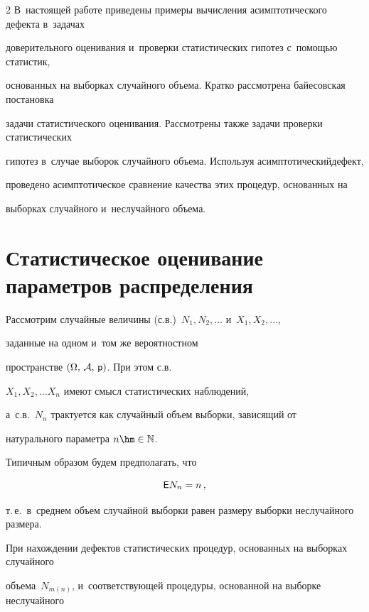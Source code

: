 \begin{multicols}{2}
В~настоящей работе приведены примеры вычисления асимптотического дефекта в~задачах 


доверительного оценивания и~проверки статистических гипотез с~помощью статистик, 


основанных на выборках случайного объема. Кратко рассмотрена байесовская постановка 


задачи статистического оценивания. Рассмотрены также задачи проверки статистических 


гипотез в~случае выборок случайного объема. Используя асимптотический\linebreak дефект, 


проведено асимптотическое сравнение качества этих процедур, основанных на 


выборках случайного и~неслучайного объема.








\section{Статистическое оценивание параметров распределения}





Рассмотрим случайные величины (с.в.)\ $N_1, N_2, \ldots$ и~$X_1, X_2, \ldots$, 


заданные на одном и~том же вероятностном 


пространстве $(\Omega,\,{\cal A},\,{\sf p})$. При этом с.в.\ 


$X_1, X_2, \ldots X_n$ имеют смысл статистических наблюдений, 


а~с.в.~$N_n$ трактуется как случайный объем выборки, зависящий от 


натурального параметра $n\hm\in \mathbb{N}$.


Типичным образом будем предполагать, что





\noindent


$$


{\sf E} N_n = n\,,


$$


т.\,е.\ в~среднем объем случайной выборки равен размеру выборки неслучайного размера. 


При на\-хож\-де\-нии дефектов статистических процедур, основанных на выборках случайного 


объема~$N_{m(n)}$, и~соответст\-ву\-ющей процедуры, основанной на выборке неслучайного 



\end{multicols}

